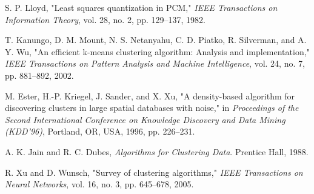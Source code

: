 \documentclass{article}
\begin{document}
\begin{thebibliography}{99}


S. P. Lloyd, "Least squares quantization in PCM," \textit{IEEE Transactions on Information Theory}, vol. 28, no. 2, pp. 129–137, 1982.

T. Kanungo, D. M. Mount, N. S. Netanyahu, C. D. Piatko, R. Silverman, and A. Y. Wu, "An efficient k-means clustering algorithm: Analysis and implementation," \textit{IEEE Transactions on Pattern Analysis and Machine Intelligence}, vol. 24, no. 7, pp. 881–892, 2002.

M. Ester, H.-P. Kriegel, J. Sander, and X. Xu, "A density-based algorithm for discovering clusters in large spatial databases with noise," in \textit{Proceedings of the Second International Conference on Knowledge Discovery and Data Mining (KDD'96)}, Portland, OR, USA, 1996, pp. 226–231.

A. K. Jain and R. C. Dubes, \textit{Algorithms for Clustering Data}. Prentice Hall, 1988.

R. Xu and D. Wunsch, "Survey of clustering algorithms," \textit{IEEE Transactions on Neural Networks}, vol. 16, no. 3, pp. 645–678, 2005.

\end{thebibliography}
\end{document}
